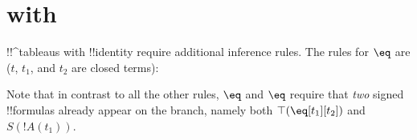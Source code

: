 \documentclass[10pt,a4paper]{article}
\theoremstyle{plain}
\theoremstyle{definition}
\theoremstyle{remark}
\newcommand*{\olfileid}[3]{}
\newcommand*{\olsection}[1]{\section*{#1}}
\providecommand{\AxiomC}[1]{}
\providecommand{\UnaryInfC}[1]{}
\providecommand{\RightLabel}[1]{}
\providecommand{\noLine}{}
\providecommand{\DisplayProof}{}
\providecommand{\sFmla}[2]{#1(#2)}
\providecommand{\True}{\top}
\providecommand{\False}{\bot}
\providecommand{\TRule}[1]{}
\begin{document}



\olfileid{fol}{tab}{ide}

\olsection{ with }

!!^{tableau}s with !!{identity} require additional inference rules.
The rules for $\eq$ are ($t$, $t_1$, and $t_2$ are closed terms):

\begin{defish}
\AxiomC{}
\RightLabel{$\eq$}
\UnaryInfC{\sFmla{\True}{\eq[t][t]}}
\DisplayProof
\hfill
\AxiomC{\sFmla{\True}{\eq[t_1][t_2]}}
\noLine
\UnaryInfC{\sFmla{\True}{!A(t_1)}}
\RightLabel{$\TRule{\True}{\eq}$}
\UnaryInfC{\sFmla{\True}{!A(t_2)}}
\DisplayProof
\hfill
\AxiomC{\sFmla{\True}{\eq[t_1][t_2]}}
\noLine
\UnaryInfC{\sFmla{\False}{!A(t_1)}}
\RightLabel{$\TRule{\False}{\eq}$}
\UnaryInfC{\sFmla{\False}{!A(t_2)}}
\DisplayProof
\end{defish}
Note that in contrast to all the other rules, $\TRule{\True}{\eq}$ and
$\TRule{\False}{\eq}$ require that \emph{two} signed !!{formula}s
already appear on the branch, namely both $\sFmla{\True}{\eq[t_1][t_2]}$
and $\sFmla{S}{!A(t_1)}$.
\end{document}
